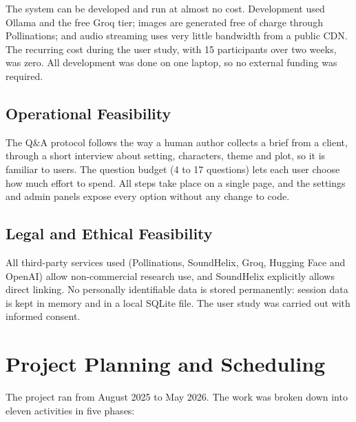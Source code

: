 The system can be developed and run at almost no cost. Development used Ollama and the free Groq tier; images are generated free of charge through Pollinations; and audio streaming uses very little bandwidth from a public CDN. The recurring cost during the user study, with 15 participants over two weeks, was zero. All development was done on one laptop, so no external funding was required.

\subsection{Operational Feasibility}

The Q\&A protocol follows the way a human author collects a brief from a client, through a short interview about setting, characters, theme and plot, so it is familiar to users. The question budget (4 to 17 questions) lets each user choose how much effort to spend. All steps take place on a single page, and the settings and admin panels expose every option without any change to code.

\subsection{Legal and Ethical Feasibility}

All third-party services used (Pollinations, SoundHelix, Groq, Hugging Face and OpenAI) allow non-commercial research use, and SoundHelix explicitly allows direct linking. No personally identifiable data is stored permanently: session data is kept in memory and in a local SQLite file. The user study was carried out with informed consent.

\section{Project Planning and Scheduling}
\label{sec:schedule}

The project ran from August 2025 to May 2026. The work was broken down into eleven activities in five phases:

